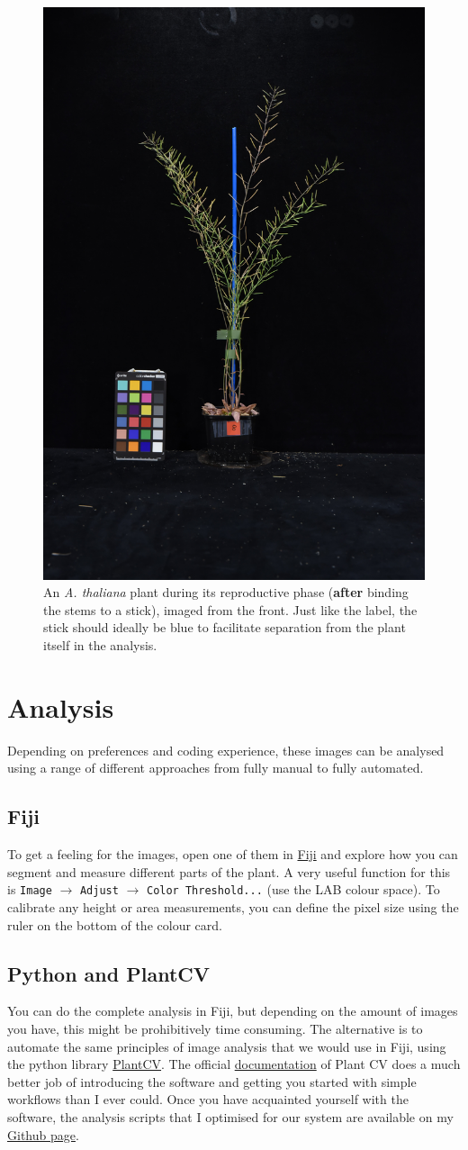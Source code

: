 \documentclass[10pt]{article}
\begin{document}
	 \begin{figure}[!h]
	 	\centering
	 	\includegraphics[width=0.3\linewidth]{20201029_8}
	 	\caption[Example image of a front-view image.]{An \textit{A. thaliana} plant during its reproductive phase (\textbf{after} binding the stems to a stick), imaged from the front. Just like the label, the stick should ideally be blue to facilitate separation from the plant itself in the analysis.}
	 	\label{fig:front_after}
	 \end{figure}
 
 \section{Analysis}
 
 Depending on preferences and coding experience, these images can be analysed using a range of different approaches from fully manual to fully automated.
 
 \subsection{Fiji}
 
 To get a feeling for the images, open one of them in \href{https://imagej.net/Fiji/Downloads}{Fiji} and explore how you can segment and measure different parts of the plant. A very useful function for this is \texttt{Image} $\rightarrow$ \texttt{Adjust} $\rightarrow$ \texttt{Color Threshold...} (use the LAB colour space). To calibrate any height or area measurements, you can define the pixel size using the ruler on the bottom of the colour card.
 
 \subsection{Python and PlantCV}
 
 You can do the complete analysis in Fiji, but depending on the amount of images you have, this might be prohibitively time consuming. The alternative is to automate the same principles of image analysis that we would use in Fiji, using the python library \href{https://plantcv.danforthcenter.org/}{PlantCV}. The official \href{https://plantcv.readthedocs.io/en/stable/}{documentation} of Plant CV does a much better job of introducing the software and getting you started with simple workflows than I ever could. Once you have acquainted yourself with the software, the analysis scripts that I optimised for our system are available on my \href{https://github.com/leonardblaschek/plantcv}{Github page}.
 	
 	
\end{document}
